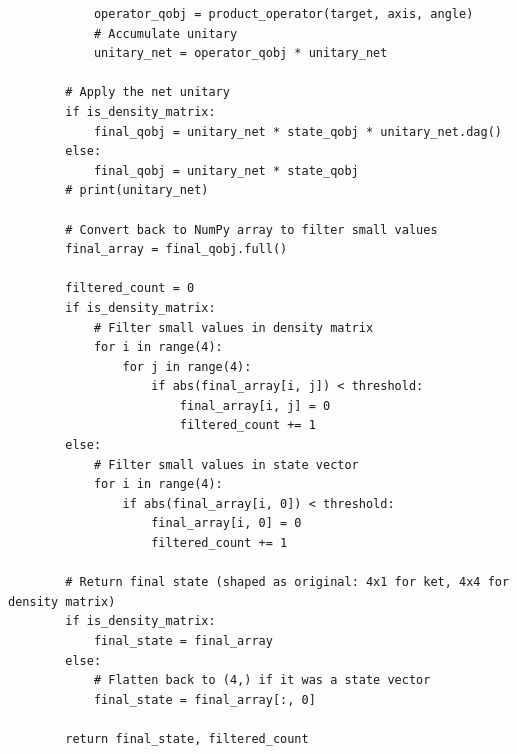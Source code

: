 \documentclass[11pt]{article}
\begin{document}
\begin{verbatim}
            operator_qobj = product_operator(target, axis, angle)
            # Accumulate unitary
            unitary_net = operator_qobj * unitary_net
        
        # Apply the net unitary
        if is_density_matrix:
            final_qobj = unitary_net * state_qobj * unitary_net.dag()
        else:
            final_qobj = unitary_net * state_qobj
        # print(unitary_net)
        
        # Convert back to NumPy array to filter small values
        final_array = final_qobj.full()
        
        filtered_count = 0
        if is_density_matrix:
            # Filter small values in density matrix
            for i in range(4):
                for j in range(4):
                    if abs(final_array[i, j]) < threshold:
                        final_array[i, j] = 0
                        filtered_count += 1
        else:
            # Filter small values in state vector
            for i in range(4):
                if abs(final_array[i, 0]) < threshold:
                    final_array[i, 0] = 0
                    filtered_count += 1
        
        # Return final state (shaped as original: 4x1 for ket, 4x4 for density matrix)
        if is_density_matrix:
            final_state = final_array
        else:
            # Flatten back to (4,) if it was a state vector
            final_state = final_array[:, 0]
        
        return final_state, filtered_count
\end{verbatim}
\end{document}
